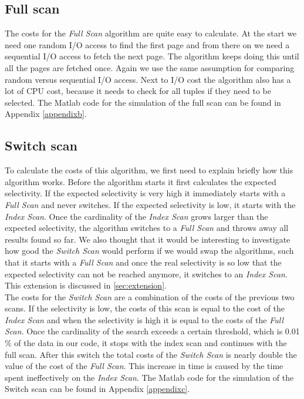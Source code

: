 \documentclass[a4paper,11pt,twoside]{article}
\begin{document}
\subsection{Full scan}
The costs for the \textit{Full Scan} algorithm are quite easy to calculate. At the start we need one random I/O access to find the first page and from there on we need a sequential I/O access to fetch the next page. The algorithm keeps doing this until all the pages are fetched once. Again we use the same assumption for comparing random versus sequential I/O access. Next to I/O cost the algorithm also has a lot of CPU cost, because it needs to check for all tuples if they need to be selected. The Matlab code for the simulation of the full scan can be found in Appendix \ref{appendixb}.

\subsection{Switch scan}
To calculate the costs of this algorithm, we first need to explain briefly how this algorithm works. Before the algorithm starts it first calculates the expected selectivity. If the expected selectivity is very high it immediately starts with a \textit{Full Scan} and never switches. If the expected selectivity is low, it starts with the \textit{Index Scan}. Once the cardinality of the \textit{Index Scan} grows larger than the expected selectivity, the algorithm switches to a \textit{Full Scan} and throws away all results found so far. We also thought that it would be interesting to investigate how good the \textit{Switch Scan} would perform if we would swap the algorithms, such that it starts with a \textit{Full Scan} and once the real selectivity is so low that the expected selectivity can not be reached anymore, it switches to an \textit{Index Scan}. This extension is discussed in \autoref{sec:extension}.\\
The costs for the \textit{Switch Scan} are a combination of the costs of the previous two scans. If the selectivity is low, the costs of this scan is equal to the cost of the \textit{Index Scan} and when the selectivity is high it is equal to the costs of the \textit{Full Scan}.  Once the cardinality of the search exceeds a certain threshold, which is 0.01$\%$ of the data in our code, it stops with the index scan and continues  with the full scan. After this switch the total costs of the \textit{Switch Scan} is nearly double the value of the cost of the \textit{Full Scan}. This increase in time is caused by the time spent ineffectively on the \textit{Index Scan}. The Matlab code for the simulation of the Switch scan can be found in Appendix \ref{appendixc}.
\end{document}
